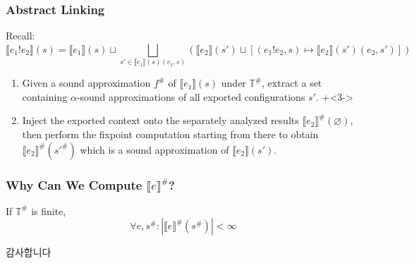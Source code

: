 \documentclass{beamer}
\newcommand*{\A}[1]{{#1}^{\#}}
\newcommand*{\Time}{\mathbb{T}}
\newcommand*{\ATime}{\A{\Time}}
\newcommand*{\link}[2]{{#1}\mathtt{!}{#2}}
\newcommand*{\sembracket}[1]{\lBrack{#1}\rBrack}
\begin{document}
\begin{frame}[c]
  \frametitle{Abstract Linking}
  Recall:
  \[
    \sembracket{\link{e_1}{e_2}}(s)=\sembracket{e_1}(s)\sqcup\bigsqcup_{s'\in\sembracket{e_1}(s)(e_1,s)}\left(\sembracket{e_2}(s')\sqcup[(\link{e_1}{e_2},s)\mapsto\sembracket{e_2}(s')(e_2,s')]\right)
  \]
  \begin{enumerate}
    \onslide+<2->\item Given a sound approximation $\A{f}$ of $\sembracket{e_1}(s)$ under $\ATime$, extract a set containing $\alpha$-sound approximations of all exported configurations $s'$.
          \onslide+<3->\item Inject the exported context onto the separately analyzed results $\A{\sembracket{e_2}}(\varnothing)$, then perform the fixpoint computation starting from there to obtain $\A{\sembracket{e_2}}(\A{s'})$ which is a sound approximation of $\sembracket{e_2}(s')$.
  \end{enumerate}
\end{frame}
\begin{frame}[c]
  \frametitle{Why Can We Compute $\A{\sembracket{e}}$?}
  \begin{theorem}
    If $\ATime$ is finite,
    \[
      \forall e,\A{s}: |\A{\sembracket{e}}(\A{s})|<\infty
    \]
  \end{theorem}
\end{frame}
\begin{frame}[c]
  \centering\LARGE
  감사합니다
\end{frame}
\end{document}
